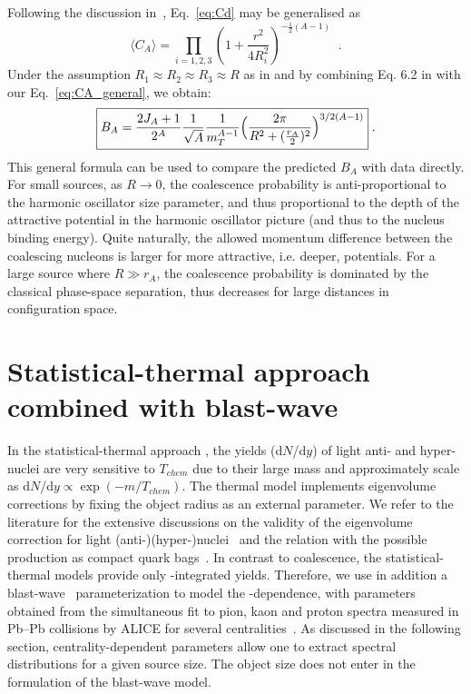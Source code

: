\documentclass[%
 reprint,
 amsmath,amssymb,
 aps,
]{revtex4-1}
\begin{document}
Following the discussion in~\cite{Scheibl:1998tk, Blum:2017qnn}, Eq.~\ref{eq:Cd} may be generalised as 
%
\begin{equation}
\langle C_{A} \rangle = \prod_{i=1,2,3} \left(1 + \frac{r^2}{4R_{i}^2} \right)^{-\frac{1}{2}(A-1)} \;\; .
\label{eq:CA_general}
\end{equation}
%
Under the assumption $R_1\approx R_2 \approx R_3 \approx R$ as in \cite{Blum:2017qnn} and by combining Eq. 6.2 in \cite{Scheibl:1998tk} with our Eq.~\ref{eq:CA_general}, 
we obtain:
%
\begin{equation}
	\boxed {  B_{A} = {2J_{A} + 1 \over 2^{A}} {1 \over \sqrt{A}} {1 \over m_{T}^{A-1}} \Bigl({2\pi \over R^2 + ({r_A \over 2})^2 }\Bigr)^{3/2(A-1)} } \;.
\end{equation}
%
This general formula can be used to compare the predicted $B_{A}$ with data directly.
For small sources, as $R \rightarrow 0$, the coalescence probability is anti-proportional to the harmonic oscillator size parameter, and thus proportional to the depth of the attractive potential in the harmonic oscillator picture (and thus to the nucleus binding energy).
Quite naturally, the allowed momentum difference between the coalescing nucleons is larger for more attractive, i.e. deeper, potentials. 
For a large source where $R \gg r_A$, the coalescence probability is dominated by the classical phase-space separation, thus decreases for large distances in configuration space. 
%

\section{Statistical-thermal approach combined with blast-wave}\label{sec:thermal}
In the statistical-thermal approach \cite{Petran:2013dva,Wheaton:2004qb,Andronic:2005yp}, the yields (d$N$/d$y$) of light anti- and hyper-nuclei are very sensitive to $T_{chem}$ due to their large mass and approximately scale as d$N$/d$y \propto \exp(-m/T_{chem})$. 
The thermal model implements eigenvolume corrections by fixing the object radius as an external parameter.
We refer to the literature for the extensive discussions on the validity of the eigenvolume correction for light \mbox{(anti-)(hyper-)}nuclei~\cite{Vovchenko:2016mwg} and the relation with the possible production as compact quark bags~\cite{Andronic:2017}.
In contrast to coalescence, the statistical-thermal models provide only \pt-integrated yields. 
Therefore, we use in addition a blast-wave~\cite{Schnedermann:1993ws} parameterization to model the \pt-dependence, with parameters obtained from the simultaneous fit to pion, kaon and proton spectra measured in Pb--Pb collisions by ALICE for several centralities~\cite{Abelev:2013vea}.  
 As discussed in the following section, centrality-dependent parameters allow one to extract spectral distributions for a given source size. 
The object size does not enter in the formulation of the blast-wave model.
\end{document}
